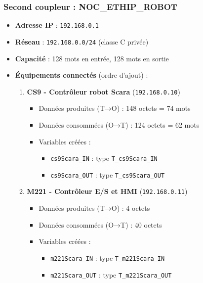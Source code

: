 \subsubsection{Second coupleur : NOC\_ETHIP\_ROBOT}

\begin{itemize}
    \item \textbf{Adresse IP} : \texttt{192.168.0.1}
    \item \textbf{Réseau} : \texttt{192.168.0.0/24} (classe C privée)

    \item \textbf{Capacité} : 128 mots en entrée, 128 mots en sortie

    \item \textbf{Équipements connectés} (ordre d'ajout) :

    \begin{enumerate}
        \item \textbf{CS9 - Contrôleur robot Scara} (\texttt{192.168.0.10})
        \begin{itemize}
            \item Données produites (T→O) : 148 octets = 74 mots
            \item Données consommées (O→T) : 124 octets = 62 mots
            \item Variables créées :
            \begin{itemize}
                \item \texttt{cs9Scara\_IN} : type \texttt{T\_cs9Scara\_IN}
                \item \texttt{cs9Scara\_OUT} : type \texttt{T\_cs9Scara\_OUT}
            \end{itemize}
        \end{itemize}

        \item \textbf{M221 - Contrôleur E/S et HMI} (\texttt{192.168.0.11})
        \begin{itemize}
            \item Données produites (T→O) : 4 octets 
            \item Données consommées (O→T) : 40 octets 
            \item Variables créées :
            \begin{itemize}
                \item \texttt{m221Scara\_IN} : type \texttt{T\_m221Scara\_IN}
                \item \texttt{m221Scara\_OUT} : type \texttt{T\_m221Scara\_OUT}
            \end{itemize}
        \end{itemize}
    \end{enumerate}
\end{itemize}


